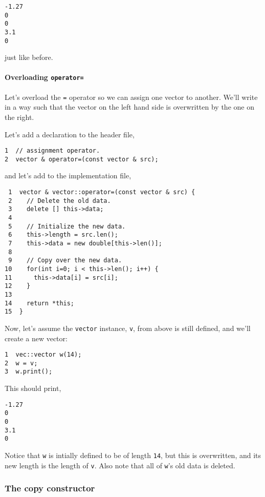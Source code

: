 \documentclass[11pt]{article}
\begin{document}
\begin{verbatim}
-1.27
0
0
3.1
0
\end{verbatim}

just like before.

\paragraph{Overloading \texttt{operator=}}
\label{sec:orgheadline53}

Let's overload the \texttt{=} operator so we can assign one vector to another. 
We'll write in a way such that the vector on the left hand side is 
overwritten by the one on the right.

Let's add a declaration to the header file,

\begin{verbatim}
1  // assignment operator.
2  vector & operator=(const vector & src);
\end{verbatim}

and let's add to the implementation file,

\begin{verbatim}
 1  vector & vector::operator=(const vector & src) {
 2    // Delete the old data.
 3    delete [] this->data;
 4  
 5    // Initialize the new data.
 6    this->length = src.len();
 7    this->data = new double[this->len()];
 8  
 9    // Copy over the new data.
10    for(int i=0; i < this->len(); i++) {
11      this->data[i] = src[i];
12    }
13  
14    return *this;
15  }
\end{verbatim}

Now, let's assume the \texttt{vector} instance, \texttt{v}, from above is still defined, and
we'll create a new vector:

\begin{verbatim}
1  vec::vector w(14);
2  w = v;
3  w.print();
\end{verbatim}

This should print, 

\begin{verbatim}
-1.27
0
0
3.1
0
\end{verbatim}

Notice that \texttt{w} is intially defined to be of length \texttt{14}, but this is 
overwritten, and its new length is the length of \texttt{v}. Also note that all of
\texttt{w}'s old data is deleted.

\subsubsection{The copy constructor}
\label{sec:orgheadline55}
\end{document}
